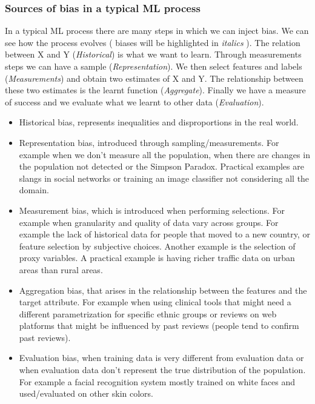 \subsubsection{Sources of bias in a typical ML process}
In a typical ML process there are many steps in which we can inject bias. We can see how the process evolves ( biases will be highlighted in \textit{italics} ).
The relation between X and Y (\textit{Historical}) is what we want to learn. Through measurements steps we can have a sample (\textit{Representation}). We then select features and labels (\textit{Measurements}) and obtain two estimates of X and Y. The relationship between these two estimates is the learnt function (\textit{Aggregate}). Finally we have a measure of success and we evaluate what we learnt to other data (\textit{Evaluation}).
\begin{itemize}
    \item Historical bias, represents inequalities and disproportions in the real world.
    \item Representation bias, introduced through sampling/measurements. For example when we don't measure all the population, when there are changes in the population not detected or the Simpson Paradox. Practical examples are slangs in social networks or training an image classifier not considering all the domain.
    \item Measurement bias, which is introduced when performing selections. For example when granularity and quality of data vary across groups. For example the lack of historical data for people that moved to a new country, or feature selection by subjective choices. Another example is the selection of proxy variables. A practical example is having richer traffic data on urban areas than rural areas.
    \item Aggregation bias, that arises in the relationship between the features and the target attribute. For example when using clinical tools that might need a different parametrization for specific ethnic groups or reviews on web platforms that might be influenced by past reviews (people tend to confirm past reviews).
    \item Evaluation bias, when training data is very different from evaluation data or when evaluation data don't represent the true distribution of the population. For example a facial recognition system mostly trained on white faces and used/evaluated on other skin colors.
\end{itemize}
